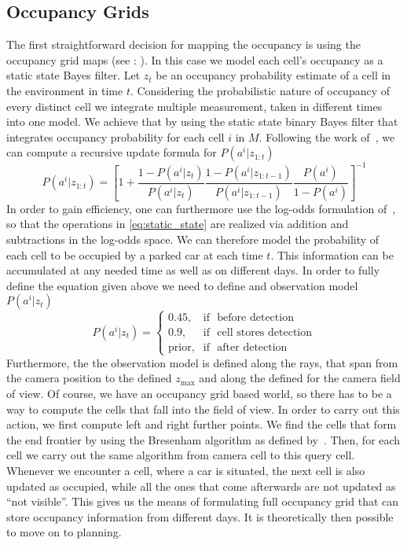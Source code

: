     \subsection{Occupancy Grids}\label{sub:occupancy_grids}
        The first straightforward decision for mapping the occupancy is using the occupancy grid maps (see : ). In this case we model each cell's occupancy as a static state Bayes filter.
        Let $z_t$ be an occupancy probability estimate of a cell in the environment in time $t$. Considering the probabilistic nature of occupancy of every distinct cell we integrate multiple measurement, taken in different times into one model. We achieve that by using the static state binary Bayes filter that integrates occupancy probability for each cell $i$ in $M$. Following the work of~\cite{moravec1988}, we can compute a recursive update formula for $P(a^i | z_{1:t})$
        \begin{equation}
        \label{eq:static_state}
            P(a^i | z_{1:t}) = \left[ {1 + \frac{1 - P(a^i | z_{t})}{P(a^i | z_{t})} \frac{1 - P(a^i | z_{1:t-1})}{P(a^i | z_{1:t-1})} \frac{P(a^i)}{1 - P(a^i)}} \right]^{-1}
        \end{equation}
        In order to gain efficiency, one can furthermore use the log-odds formulation of~\cite{moravec1988}, so that the operations in \eqref{eq:static_state} are realized via addition and subtractions in the log-odds space.
        We can therefore model the probability of each cell to be occupied by a parked car at each time $t$.
        This information can be accumulated at any needed time as well as on different days.
        In order to fully define the equation given above we need to define and observation model $P(a^i | z_t)$
        \begin{equation}
        \label{eq:observation_model}
            P(a^i | z_t) = \begin{cases} 0.45, & \mbox{if } \mbox{ before detection} \\ 0.9, & \mbox{if } \mbox{ cell stores detection} \\ \mbox{prior}, & \mbox{if } \mbox{ after detection} \end{cases}
        \end{equation}
        Furthermore, the the observation model is defined along the rays, that span from the camera position to the defined $z_{\max}$ and along the defined for the camera field of view. Of course, we have an occupancy grid based world, so there has to be a way to compute the cells that fall into the field of view. In order to carry out this action, we first compute left and right further points. We find the cells that form the end frontier by using the Bresenham algorithm as defined by~\cite{bresenham1965}. Then, for each cell we carry out the same algorithm from camera cell to this query cell. Whenever we encounter a cell, where a car is situated, the next cell is also updated as occupied, while all the ones that come afterwards are not updated as ``not visible''.
        This gives us the means of formulating full occupancy grid that can store occupancy information from different days. It is theoretically then possible to move on to planning.
